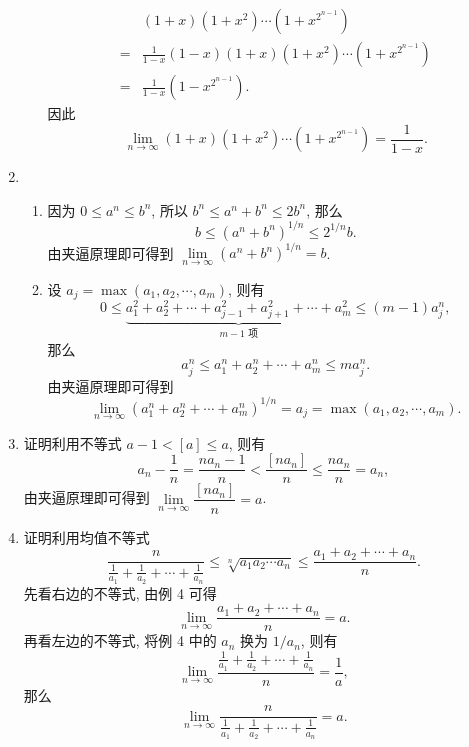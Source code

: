 \begin{enumerate}
\begin{enumerate}[(1)]
\begin{align*}
                        & (1 + x)(1 + x^2) \cdots (1+x^{2^{n-1}}) \\
                    ={} & \frac{1}{1-x}(1 - x)(1 + x)(1 + x^2) \cdots (1 + x^{2^{n-1}}) \\
                    ={} & \frac{1}{1-x}(1 - x^{2^{n-1}}).
                \end{align*}
                因此
                \[
                    \lim\limits_{n\to\infty}(1 + x)(1 + x^2)\cdots(1 + x^{2^{n-1}}) = \frac{1}{1-x}.
                \]
        \end{enumerate}
    \item %
        \begin{enumerate}[(1)]
            \item %
                因为 $0 \leqslant a^n \leqslant b^n$, 所以 $b^n \leqslant a^n + b^n \leqslant 2b^n$, 那么
                \[
                    b \leqslant (a^n + b^n)^{1/n} \leqslant 2^{1/n} b.
                \]
                由夹逼原理即可得到 $\lim\limits_{n\to\infty}(a^n + b^n)^{1/n} = b$.
            \item %
                设 $a_j = \max(a_1, a_2, \cdots, a_m)$, 则有
                \[
                    0 \leqslant \underbrace{a_1^2 + a_2^2 + \cdots + a_{j-1}^2 + a_{j+1}^2 + \cdots + a_m^2}_{\text{$m-1$ 项}} \leqslant (m-1)a_j^n,    
                \]
                那么
                \[
                    a_j^n \leqslant a_1^n + a_2^n + \cdots + a_m^n \leqslant ma_j^n.    
                \]
                由夹逼原理即可得到
                \[
                    \lim_{n\to\infty}(a_1^n + a_2^n + \cdots + a_m^n)^{1/n} = a_j = \max(a_1, a_2, \cdots, a_m).
                \]
        \end{enumerate}
    \item
        {\heiti 证明}\quad 利用不等式 $a - 1 < [a] \leqslant a$, 则有
        \begin{equation*}
            a_n - \frac 1n = \frac{na_n - 1}{n} < \frac{[na_n]}{n} \leqslant \frac{na_n}{n} = a_n,
        \end{equation*}
        由夹逼原理即可得到 $\lim\limits_{n\to\infty}\dfrac{[na_n]}{n} = a$.
    \item 
        {\heiti 证明}\quad 利用均值不等式
        \[\frac{n}{\frac{1}{a_1} + \frac{1}{a_2} + \cdots + \frac{1}{a_n}} \leqslant \sqrt[n]{a_1a_2\cdots a_n} \leqslant \frac{a_1 + a_2 + \cdots + a_n}{n}.\]
        先看右边的不等式, 由例 4 可得
        \[
            \lim_{n\to\infty}\dfrac{a_1 + a_2 + \cdots + a_n}{n} = a.
        \]
        再看左边的不等式, 将例 4 中的 $a_n$ 换为 $1/a_n$, 则有
        \[
            \lim_{n\to\infty}\dfrac{\frac{1}{a_1} + \frac{1}{a_2} + \cdots + \frac{1}{a_n}}{n} = \dfrac 1a,
        \]
        那么
        \[
            \lim_{n\to\infty}\dfrac{n}{\frac{1}{a_1} + \frac{1}{a_2} + \cdots + \frac{1}{a_n}} = a.
        \]
    

\end{enumerate}
